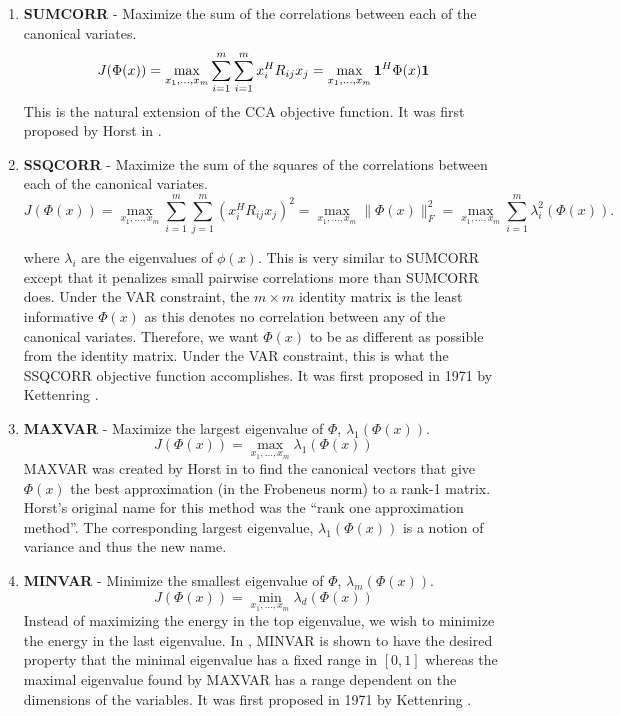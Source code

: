 \begin{enumerate}
\item \textbf{SUMCORR} - Maximize the sum of the correlations between each of the canonical variates.
  \begin{equation*}
    J(\Phi(x)) = \max_{x_1,\dots,x_m} \sum_{i=1}^m\sum_{i=1}^m x_i^HR_{ij}x_j=\max_{x_1,\dots,x_m}\mathbf 1^H\Phi(x) \mathbf 1 
  \end{equation*}
  This is the natural extension of the CCA objective function. It  was first proposed by
  Horst in \cite{horst1961relations}. 

\item \textbf{SSQCORR} - Maximize the sum of the squares of the correlations between
  each of the canonical variates.
  \begin{equation*}
    J(\Phi(x)) = \max_{x_1,\dots,x_m}\sum_{i=1}^m\sum_{j=1}^m(x_i^HR_{ij}x_j)^2=
    \max_{x_1,\dots,x_m}\|\Phi(x)\|_F^2 =
    \max_{x_1,\dots,x_m}\sum_{i=1}^m\lambda_i^2(\Phi(x)). 
  \end{equation*}

  where $\lambda_i$ are the eigenvalues of $\phi(x)$. This is very similar to SUMCORR
  except that it penalizes small pairwise correlations more than SUMCORR does. Under the
  VAR constraint, the $m\times m$ identity matrix is the least informative $\Phi(x)$ as
  this denotes no correlation between any of the canonical variates. Therefore, we want
  $\Phi(x)$ to be as different as possible from the identity matrix. Under the VAR
  constraint, this is what the SSQCORR objective function accomplishes. It was first
  proposed in 1971 by Kettenring \cite{kettenring1971canonical}.

\item \textbf{MAXVAR} - Maximize the largest eigenvalue of $\Phi$, $\lambda_1(\Phi(x))$.
  \begin{equation*}
    J(\Phi(x)) = \max_{x_1,\dots,x_m}\lambda_1(\Phi(x))
  \end{equation*}
  MAXVAR was created by Horst in \cite{horst1961relations} to find the canonical vectors
  that give $\Phi(x)$ the best approximation (in the Frobeneus norm) to a rank-1
  matrix. Horst's original name for this method was the ``rank one approximation
  method''. The corresponding largest eigenvalue, $\lambda_1(\Phi(x))$ is a notion of
  variance and thus the new name.

\item \textbf{MINVAR} - Minimize the smallest eigenvalue of $\Phi$, $\lambda_m(\Phi(x))$.
  \begin{equation*}
    J(\Phi(x)) = \min_{x_1,\dots,x_m}\lambda_d(\Phi(x))
  \end{equation*}
  Instead of maximizing the energy in the top eigenvalue, we wish to minimize the energy
  in the last eigenvalue. In \cite{bach2003kernel}, MINVAR is shown to have the desired
  property that the minimal eigenvalue has a fixed range in $[0,1]$ whereas the maximal
  eigenvalue found by MAXVAR has a range dependent on the dimensions of the variables. It
  was first proposed in 1971 by Kettenring \cite{kettenring1971canonical}.


\end{enumerate}
